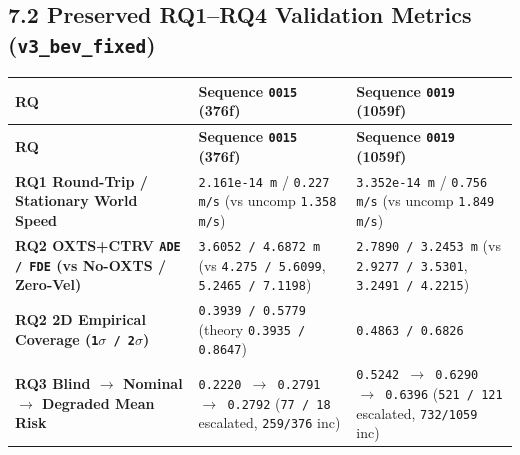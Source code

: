 \documentclass[10.5pt,a4paper]{article}
\begin{document}
\subsection{7.2 Preserved RQ1--RQ4 Validation Metrics (\texttt{v3\_\allowbreak{}bev\_\allowbreak{}fixed})}

\begin{footnotesize}
\setlength{\tabcolsep}{4pt}
\setlength{\LTleft}{0pt}\setlength{\LTright}{0pt}
\begin{longtable}{>{\raggedright\arraybackslash}p{} >{\raggedright\arraybackslash}p{} >{\raggedright\arraybackslash}p{}}
\toprule
\textbf{RQ} & \textbf{Sequence \texttt{0015} (376f)} & \textbf{Sequence \texttt{0019} (1059f)} \\
\midrule
\endfirsthead
\toprule
\textbf{RQ} & \textbf{Sequence \texttt{0015} (376f)} & \textbf{Sequence \texttt{0019} (1059f)} \\
\midrule
\endhead
\bottomrule
\endfoot
\textbf{RQ1 Round-Trip / Stationary World Speed} & \texttt{2.\allowbreak{}161e-\allowbreak{}14 m} / \texttt{0.\allowbreak{}227 m/\allowbreak{}s} (vs uncomp \texttt{1.\allowbreak{}358 m/\allowbreak{}s}) & \texttt{3.\allowbreak{}352e-\allowbreak{}14 m} / \texttt{0.\allowbreak{}756 m/\allowbreak{}s} (vs uncomp \texttt{1.\allowbreak{}849 m/\allowbreak{}s}) \\
\textbf{RQ2 OXTS+CTRV \texttt{ADE /\allowbreak{} FDE} (vs No-OXTS / Zero-Vel)} & \texttt{3.\allowbreak{}6052 /\allowbreak{} 4.\allowbreak{}6872 m} (vs \texttt{4.\allowbreak{}275 /\allowbreak{} 5.\allowbreak{}6099}, \texttt{5.\allowbreak{}2465 /\allowbreak{} 7.\allowbreak{}1198}) & \texttt{2.\allowbreak{}7890 /\allowbreak{} 3.\allowbreak{}2453 m} (vs \texttt{2.\allowbreak{}9277 /\allowbreak{} 3.\allowbreak{}5301}, \texttt{3.\allowbreak{}2491 /\allowbreak{} 4.\allowbreak{}2215}) \\
\textbf{RQ2 2D Empirical Coverage (\texttt{1$\sigma$ /\allowbreak{} 2$\sigma$})} & \texttt{0.\allowbreak{}3939 /\allowbreak{} 0.\allowbreak{}5779} (theory \texttt{0.\allowbreak{}3935 /\allowbreak{} 0.\allowbreak{}8647}) & \texttt{0.\allowbreak{}4863 /\allowbreak{} 0.\allowbreak{}6826} \\
\textbf{RQ3 Blind $\rightarrow$ Nominal $\rightarrow$ Degraded Mean Risk} & \texttt{0.\allowbreak{}2220 $\rightarrow$ 0.\allowbreak{}2791 $\rightarrow$ 0.\allowbreak{}2792} (\texttt{77 /\allowbreak{} 18} escalated, \texttt{259/\allowbreak{}376} inc) & \texttt{0.\allowbreak{}5242 $\rightarrow$ 0.\allowbreak{}6290 $\rightarrow$ 0.\allowbreak{}6396} (\texttt{521 /\allowbreak{} 121} escalated, \texttt{732/\allowbreak{}1059} inc) \\

\end{longtable}
\end{footnotesize}
\end{document}
